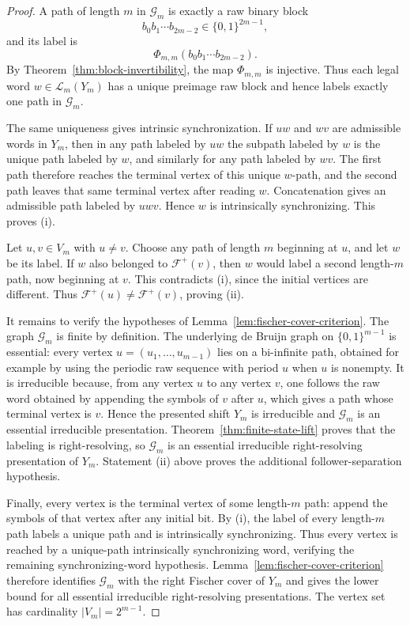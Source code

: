 \begin{proof}
A path of length $m$ in $\mathcal G_m$ is exactly a raw binary block
\[
b_0b_1\cdots b_{2m-2}\in\{0,1\}^{2m-1},
\]
and its label is
\[
\Phi_{m,m}(b_0b_1\cdots b_{2m-2}).
\]
By Theorem~\ref{thm:block-invertibility}, the map $\Phi_{m,m}$ is injective.
Thus each legal word $w\in\mathcal L_m(Y_m)$ has a unique preimage raw
block and hence labels exactly one path in $\mathcal G_m$.

The same uniqueness gives intrinsic synchronization. If $uw$ and $wv$ are
admissible words in $Y_m$, then in any path labeled by $uw$ the subpath labeled
by $w$ is the unique path labeled by $w$, and similarly for any path labeled by
$wv$.  The first path therefore reaches the terminal vertex of this unique
$w$-path, and the second path leaves that same terminal vertex after reading
$w$.  Concatenation gives an admissible path labeled by $uwv$.  Hence $w$ is
intrinsically synchronizing.  This proves (i).

Let $u,v\in V_m$ with $u\ne v$.  Choose any path of length $m$ beginning at
$u$, and let $w$ be its label.  If $w$ also belonged to $\mathcal F^+(v)$, then
$w$ would label a second length-$m$ path, now beginning at $v$.  This contradicts
(i), since the initial vertices are different.  Thus
$\mathcal F^+(u)\ne\mathcal F^+(v)$, proving (ii).

It remains to verify the hypotheses of
Lemma~\ref{lem:fischer-cover-criterion}. The graph $\mathcal G_m$ is finite by
definition. The underlying de Bruijn graph on
$\{0,1\}^{m-1}$ is essential: every vertex
$u=(u_1,\ldots,u_{m-1})$ lies on a bi-infinite path, obtained for example by
using the periodic raw sequence with period $u$ when $u$ is nonempty. It is
irreducible because, from any vertex $u$ to any vertex $v$, one follows the
raw word obtained by appending the symbols of $v$ after $u$, which gives a
path whose terminal vertex is $v$. Hence the presented shift $Y_m$ is
irreducible and $\mathcal G_m$ is an essential irreducible presentation.
Theorem~\ref{thm:finite-state-lift} proves that the labeling is
right-resolving, so $\mathcal G_m$ is an essential irreducible
right-resolving presentation of $Y_m$. Statement (ii) above proves the
additional follower-separation hypothesis.

Finally, every vertex is the terminal vertex of some length-$m$ path: append
the symbols of that vertex after any initial bit. By (i), the label of every
length-$m$ path labels a unique path and is intrinsically synchronizing. Thus
every vertex is reached by a unique-path intrinsically synchronizing word,
verifying the remaining synchronizing-word hypothesis.
Lemma~\ref{lem:fischer-cover-criterion} therefore identifies $\mathcal G_m$
with the right Fischer cover of $Y_m$ and gives the lower bound for all
essential irreducible right-resolving presentations. The vertex set has
cardinality $|V_m|=2^{m-1}$.
\end{proof}

